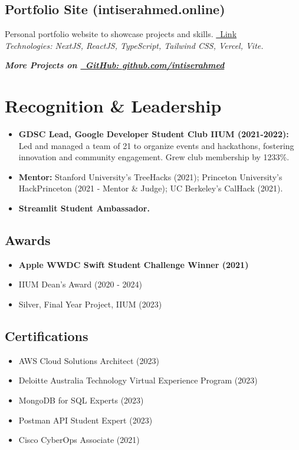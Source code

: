 \documentclass[10pt,letterpaper]{article} %
\begin{document}
\subsection*{Portfolio Site (intiserahmed.online)}
\noindent Personal portfolio website to showcase projects and skills. \href{https://intiserahmed.online/}{\faGlobe~Link} \\
\textit{Technologies: NextJS, ReactJS, TypeScript, Tailwind CSS, Vercel, Vite.}
\vspace{1ex}

\noindent\textbf{\textit{More Projects on \href{https://github.com/intiserahmed}{\faGithubSquare~GitHub: github.com/intiserahmed}}}

\section{Recognition & Leadership}
\begin{itemize}
    \item \textbf{GDSC Lead, Google Developer Student Club IIUM (2021-2022):} Led and managed a team of 21 to organize events and hackathons, fostering innovation and community engagement. Grew club membership by 1233\%.
    \item \textbf{Mentor:} Stanford University's TreeHacks (2021); Princeton University's HackPrinceton (2021 - Mentor & Judge); UC Berkeley's CalHack (2021).
    \item \textbf{Streamlit Student Ambassador.}
\end{itemize}

\subsection*{Awards}
\begin{itemize}
    \item \textbf{Apple WWDC Swift Student Challenge Winner (2021)}
    \item IIUM Dean's Award (2020 - 2024)
    \item Silver, Final Year Project, IIUM (2023)
\end{itemize}

\subsection*{Certifications}
\begin{itemize}
    \item AWS Cloud Solutions Architect (2023)
    \item Deloitte Australia Technology Virtual Experience Program (2023)
    \item MongoDB for SQL Experts (2023)
    \item Postman API Student Expert (2023)
    \item Cisco CyberOps Associate (2021)
\end{itemize}
\end{document}
